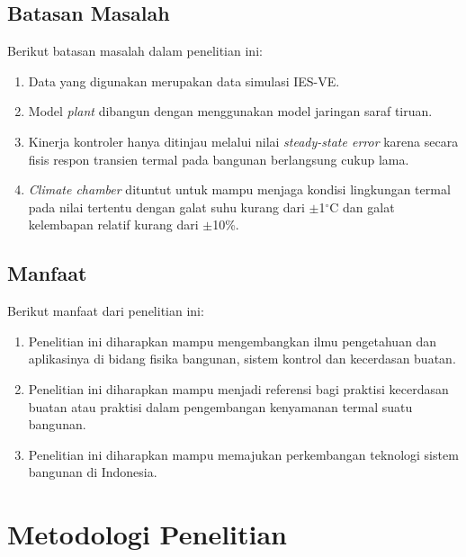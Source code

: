 \documentclass[a4paper,10pt]{article}
\newenvironment{body}{\begin{multicols}{2}}{\end{multicols}}
\begin{document}
\begin{body}
		\subsection{Batasan Masalah}
		Berikut batasan masalah dalam penelitian ini:
		\begin{enumerate}
			\item Data yang digunakan merupakan data simulasi IES-VE.
			\item Model \textit{plant} dibangun dengan menggunakan model jaringan saraf tiruan.
			\item Kinerja kontroler hanya ditinjau melalui nilai \textit{steady-state error} karena secara fisis respon transien termal pada bangunan berlangsung cukup lama.
			\item \textit{Climate chamber} dituntut untuk mampu menjaga kondisi lingkungan termal pada nilai tertentu dengan galat suhu kurang dari $\pm$1$^{\circ}$C dan galat kelembapan relatif kurang dari $\pm$10\%.
		\end{enumerate}
		
		\vspace{2mm}
		
		\subsection{Manfaat}
		Berikut manfaat dari penelitian ini:
		\begin{enumerate}
			\item Penelitian ini diharapkan mampu mengembangkan ilmu pengetahuan dan aplikasinya di bidang fisika bangunan, sistem kontrol dan kecerdasan buatan.
			\item Penelitian ini diharapkan mampu menjadi referensi bagi praktisi kecerdasan buatan atau praktisi dalam pengembangan kenyamanan termal suatu bangunan.
			\item Penelitian ini diharapkan mampu memajukan perkembangan teknologi sistem bangunan di Indonesia.
		\end{enumerate}
		
		\vspace{2mm}
		
		\section{Metodologi Penelitian}
		

\end{body}
\end{document}

